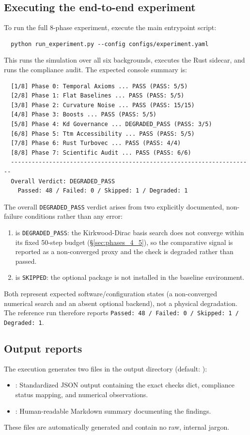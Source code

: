 \subsection{Executing the end-to-end experiment}
To run the full 8-phase experiment, execute the main entrypoint script:
\begin{verbatim}
  python run_experiment.py --config configs/experiment.yaml
\end{verbatim}
This runs the simulation over all six backgrounds, executes the Rust sidecar, and runs the compliance audit. The expected console summary is:
\begin{verbatim}
  [1/8] Phase 0: Temporal Axioms ... PASS (PASS: 5/5)
  [2/8] Phase 1: Flat Baselines ... PASS (PASS: 5/5)
  [3/8] Phase 2: Curvature Noise ... PASS (PASS: 15/15)
  [4/8] Phase 3: Boosts ... PASS (PASS: 5/5)
  [5/8] Phase 4: Kd Governance ... DEGRADED_PASS (PASS: 3/5)
  [6/8] Phase 5: Ttm Accessibility ... PASS (PASS: 5/5)
  [7/8] Phase 6: Rust Turbovec ... PASS (PASS: 4/4)
  [8/8] Phase 7: Scientific Audit ... PASS (PASS: 6/6)
  ----------------------------------------------------------------------
  Overall Verdict: DEGRADED_PASS
    Passed: 48 / Failed: 0 / Skipped: 1 / Degraded: 1
\end{verbatim}

The overall \texttt{DEGRADED\_PASS} verdict arises from two explicitly documented, non-failure conditions rather than any error:
\begin{enumerate}
  \item {} is \texttt{DEGRADED\_PASS}: the Kirkwood-Dirac basis search does not converge within its fixed 50-step budget (\S\ref{sec:phases_4_5}), so the comparative signal is reported as a non-converged proxy and the check is degraded rather than passed.
  \item {} is \texttt{SKIPPED}: the optional package  is not installed in the baseline environment.
\end{enumerate}
Both represent expected software/configuration states (a non-converged numerical search and an absent optional backend), not a physical degradation. The reference run therefore reports \texttt{Passed: 48 / Failed: 0 / Skipped: 1 / Degraded: 1}.

\subsection{Output reports}
The execution generates two files in the output directory (default: ):
\begin{itemize}[leftmargin=*]
  \item {}: Standardized JSON output containing the exact checks dict, compliance status mapping, and numerical observations.
  \item {}: Human-readable Markdown summary documenting the findings.
\end{itemize}
These files are automatically generated and contain no raw, internal jargon.
